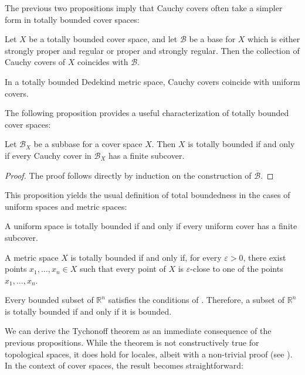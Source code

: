 \documentclass[reqno]{amsart}
\theoremstyle{definition}
\theoremstyle{remark}
\numberwithin{figure}{section}
\begin{document}
The previous two propositions imply that Cauchy covers often take a simpler form in totally bounded cover spaces:

\begin{cor}
Let $X$ be a totally bounded cover space, and let $\mathcal{B}$ be a base for $X$ which is either strongly proper and regular or proper and strongly regular.
Then the collection of Cauchy covers of $X$ coincides with $\mathcal{B}$.
\end{cor}

\begin{cor}
In a totally bounded Dedekind metric space, Cauchy covers coincide with uniform covers.
\end{cor}

The following proposition provides a useful characterization of totally bounded cover spaces:

\begin{prop}[tb-aux]
Let $\mathcal{B}_X$ be a subbase for a cover space $X$.
Then $X$ is totally bounded if and only if every Cauchy cover in $\mathcal{B}_X$ has a finite subcover.
\end{prop}
\begin{proof}
The proof follows directly by induction on the construction of $\overline{\mathcal{B}}$.
\end{proof}

This proposition yields the usual definition of total boundedness in the cases of uniform spaces and metric spaces:

\begin{cor}
A uniform space is totally bounded if and only if every uniform cover has a finite subcover.
\end{cor}

\begin{cor}[tb-metric]
A metric space $X$ is totally bounded if and only if, for every $\varepsilon > 0$,
there exist points $x_1, \ldots, x_n \in X$ such that every point of $X$ is $\varepsilon$-close to one of the points $x_1, \ldots, x_n$.
\end{cor}

\begin{example}
Every bounded subset of $\mathbb{R}^n$ satisfies the conditions of .
Therefore, a subset of $\mathbb{R}^n$ is totally bounded if and only if it is bounded.
\end{example}

We can derive the Tychonoff theorem as an immediate consequence of the previous propositions.
While the theorem is not constructively true for topological spaces, it does hold for locales, albeit with a non-trivial proof (see \cite{vickers-tychonoff,vickers-compact}).
In the context of cover spaces, the result becomes straightforward:
\end{document}
